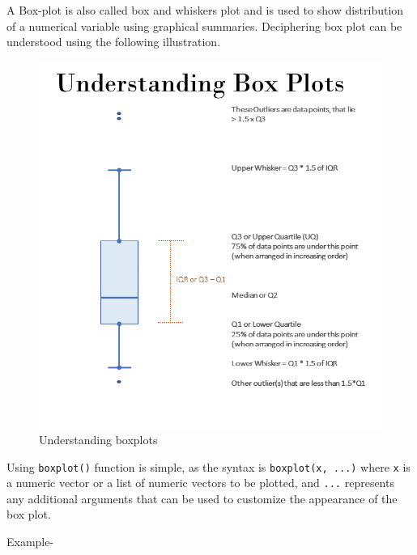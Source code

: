 \documentclass[
]{book}
\newenvironment{Shaded}{\begin{snugshade}}{\end{snugshade}}
\newcommand{\FunctionTok}[1]{\textcolor[rgb]{0.13,0.29,0.53}{\textbf{#1}}}
\newcommand{\NormalTok}[1]{#1}
\newcommand{\SpecialCharTok}[1]{\textcolor[rgb]{0.81,0.36,0.00}{\textbf{#1}}}
\begin{document}
A Box-plot is also called box and whiskers plot and is used to show distribution of a numerical variable using graphical summaries. Deciphering box plot can be understood using the following illustration.

\begin{figure}

{\centering \includegraphics[width=9.35in,height=0.45\textheight]{images/boxplots} 

}

\caption{Understanding boxplots}\label{fig:boxplots}
\end{figure}

Using \texttt{boxplot()} function is simple, as the syntax is \texttt{boxplot(x,\ ...)} where \texttt{x} is a numeric vector or a list of numeric vectors to be plotted, and \texttt{...} represents any additional arguments that can be used to customize the appearance of the box plot.

Example-

\begin{Shaded}
\end{Shaded}
\end{document}

